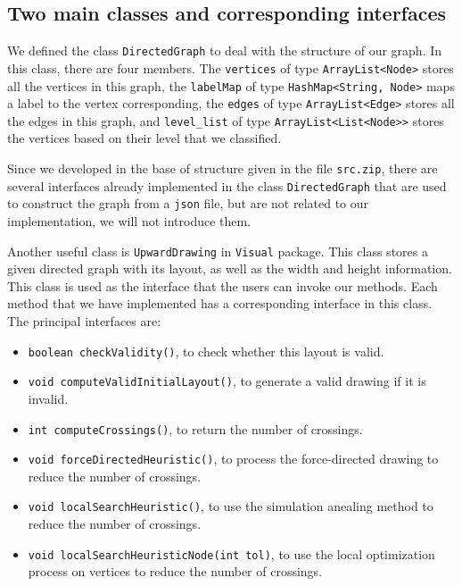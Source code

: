 \subsection{Two main classes and corresponding interfaces}

We defined the class \lstinline{DirectedGraph} to deal with the structure of our graph. 
In this class, there are four members. 
The \lstinline{vertices} of type \lstinline{ArrayList<Node>} stores all the vertices in this graph, 
the \lstinline{labelMap} of type \lstinline{HashMap<String, Node>} maps a label to the vertex corresponding, 
the \lstinline{edges} of type \lstinline{ArrayList<Edge>} stores all the edges in this graph, 
and \lstinline{level_list} of type \lstinline{ArrayList<List<Node>>} stores the vertices based on their level that we classified.

Since we developed in the base of structure given in the file \lstinline{src.zip}, there are several interfaces already implemented in the class \lstinline{DirectedGraph} that are used to construct the graph from a \lstinline{json} file, but are not related to our implementation, we will not introduce them. 

Another useful class is \lstinline{UpwardDrawing} in \lstinline{Visual} package. 
This class stores a given directed graph with its layout, as well as the width and height information.
This class is used as the interface that the users can invoke our methods. Each method that we have implemented has a corresponding interface in this class. 
The principal interfaces are:
\begin{itemize}
    \item \lstinline{boolean checkValidity()}, to check whether this layout is valid.
    \item \lstinline{void computeValidInitialLayout()}, to generate a valid drawing if it is invalid.
    \item \lstinline{int computeCrossings()}, to return the number of crossings.
    \item \lstinline{void forceDirectedHeuristic()}, to process the force-directed drawing to reduce the number of crossings.
    \item \lstinline{void localSearchHeuristic()}, to use the simulation anealing method to reduce the number of crossings.
    \item \lstinline{void localSearchHeuristicNode(int tol)}, to use the local optimization process on vertices to reduce the number of crossings.
\end{itemize}
\quad



